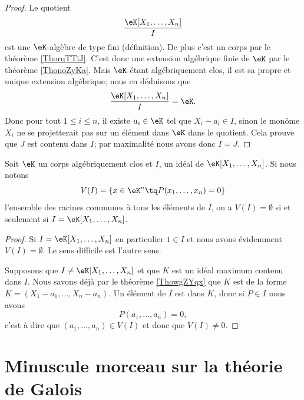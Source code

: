 \begin{proof}
    Le quotient
    \begin{equation}
        \frac{ \eK[X_1,\ldots, X_n] }{ I }
    \end{equation}
    est une \( \eK\)-algèbre de type fini (définition). De plus c'est un corps par le théorème \ref{ThorqTTiJ}. C'est donc une extension algébrique finie de \( \eK\) par le théorème \ref{ThonoZyKa}. Mais \( \eK\) étant algébriquement clos, il est sa propre et unique extension algébrique; nous en déduisons que
    \begin{equation}
        \frac{ \eK[X_1,\ldots, X_n] }{ I }=\eK.
    \end{equation}
    Donc pour tout \( 1\leq i\leq n\), il existe \( a_i\in \eK\) tel que \( X_i-a_i\in I\), sinon le monôme \( X_i\) ne se projetterait pas sur un élément dans \( \eK\) dans le quotient. Cela prouve que \( J\) est contenu dans \( I\); par maximalité nous avons donc \( I=J\).
\end{proof}

\begin{corollary}
    Soit \( \eK\) un corps algébriquement clos et \( I\), un idéal de \( \eK[X_1,\ldots, X_n]\). Si nous notons
    \begin{equation}
        V(I)=\{ x\in \eK^n\tq P(x_1,\ldots, x_n)=0 \}
    \end{equation}
    l'ensemble des racines communes à tous les éléments de \( I\), on a \( V(I)=\emptyset\) si et seulement si \( I=\eK[X_1,\ldots, X_n]\).
\end{corollary}

\begin{proof}
    Si \( I=\eK[X_1,\ldots, X_n]\) en particulier \( 1\in I\) et nous avons évidemment \( V(I)=\emptyset\). Le sens difficile est l'autre sens.

    Supposons que \( I\neq \eK[X_1,\ldots, X_n]\) et que \( K\) est un idéal maximum contenu dans \( I\). Nous savons déjà par le théorème \ref{ThowgZYqx} que \( K\) est de la forme \( K=(X_1-a_1,\ldots, X_n-a_n)\). Un élément de \( I\) est dans \( K\), donc si \( P\in I\) nous avons
    \begin{equation}
        P(a_1,\ldots, a_n)=0,
    \end{equation}
    c'est à dire que \( (a_1,\ldots, a_n)\in V(I)\) et donc que \( V(I)\neq 0\).
\end{proof}


\section{Minuscule morceau sur la théorie de Galois}

